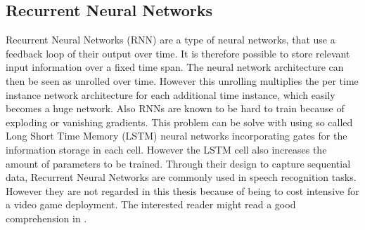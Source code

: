 
\subsection{Recurrent Neural Networks}\label{sec:prev_nn_rnn}
Recurrent Neural Networks (RNN) are a type of neural networks, that use a feedback loop of their output over time.
It is therefore possible to store relevant input information over a fixed time span.
The neural network architecture can then be seen as unrolled over time.
However this unrolling multiplies the per time instance network architecture for each additional time instance,
which easily becomes a huge network.
Also RNNs are known to be hard to train because of exploding or vanishing gradients.
This problem can be solve with using so called Long Short Time Memory (LSTM) neural networks incorporating gates for the information storage in each cell. However the LSTM cell also increases the amount of parameters to be trained.
Through their design to capture sequential data, Recurrent Neural Networks are commonly used in speech recognition tasks.
However they are not regarded in this thesis because of being to cost intensive for a video game deployment.
The interested reader might read a good comprehension in \cite{Staudenmeyer2019}.

